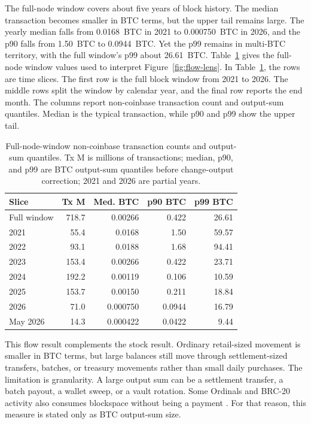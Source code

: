 \documentclass[conference]{IEEEtran}
\begin{document}
The full-node window covers about five years of block history. The median
transaction becomes smaller in BTC terms, but the upper tail remains large.
The yearly median falls from 0.0168~BTC in 2021 to 0.000750~BTC in 2026,
and the p90 falls from 1.50~BTC to 0.0944~BTC. Yet the p99 remains in
multi-BTC territory, with the full window's p99 about 26.61~BTC.
Table~\ref{tab:flow-summary} gives the full-node window values used to
interpret Figure~\ref{fig:flow-lens}. In Table~\ref{tab:flow-summary},
the rows are time slices. The first row is the full block
window from 2021 to 2026. The middle rows split the window by calendar
year, and the final row reports the end month. The columns report non-coinbase
transaction count and output-sum quantiles. Median is the typical
transaction, while p90 and p99 show the upper tail.

\begin{table}[!tbp]
  \centering
  \scriptsize
  \setlength{\tabcolsep}{2.5pt}
  \renewcommand{\arraystretch}{1.00}
  \begin{tabular}{@{}lrrrr@{}}
    \toprule
    \textbf{Slice} & \textbf{Tx M} & \textbf{Med. BTC} & \textbf{p90 BTC} & \textbf{p99 BTC} \\
    \midrule
    Full window & 718.7 & 0.00266 & 0.422 & 26.61 \\
    2021 & 55.4 & 0.0168 & 1.50 & 59.57 \\
    2022 & 93.1 & 0.0188 & 1.68 & 94.41 \\
    2023 & 153.4 & 0.00266 & 0.422 & 23.71 \\
    2024 & 192.2 & 0.00119 & 0.106 & 10.59 \\
    2025 & 153.7 & 0.00150 & 0.211 & 18.84 \\
    2026 & 71.0 & 0.000750 & 0.0944 & 16.79 \\
    May 2026 & 14.3 & 0.000422 & 0.0422 & 9.44 \\
    \bottomrule
  \end{tabular}
  \vspace{1em}
  \caption{Full-node-window non-coinbase transaction counts and output-sum
  quantiles. Tx M is millions of transactions; median, p90, and p99 are BTC
  output-sum quantiles before change-output correction; 2021 and 2026 are
  partial years.}
  \label{tab:flow-summary}
\end{table}

This flow result complements the stock result. Ordinary retail-sized
movement is smaller in BTC terms, but large balances still move through
settlement-sized transfers, batches, or treasury movements rather than small
daily purchases. The limitation is granularity. A large output sum can be a
settlement transfer, a batch payout, a wallet sweep, or a vault rotation.
Some Ordinals and BRC-20 activity also consumes blockspace without being a
payment \cite{rodarmor2023ordinals, domo2023brc20}. For that reason, this
measure is stated only as BTC output-sum size.
\end{document}
